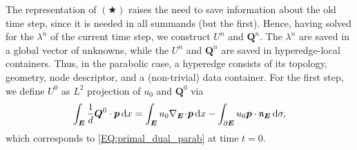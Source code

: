 \documentclass[a4paper, english, 12pt, reqno, draft]{amsart}
\theoremstyle{definition}
\theoremstyle{remark}
\numberwithin{equation}{section}
\newcommand{\Edge}{{\ensuremath{\boldsymbol E}}}
\newcommand{\Nabla}{\ensuremath{\nabla_\Edge}}
\newcommand{\Div}{\ensuremath{\Nabla\!\cdot\!}}
\newcommand{\Normal}{\ensuremath{\mathfrak n_\Edge}}
\renewcommand{\vec}[1]{\ensuremath{\boldsymbol{#1}}}
\newcommand{\dx}{\ensuremath{\, \textup d x}}
\newcommand{\ds}{\ensuremath{\, \textup d \sigma}}
\begin{document}
The representation of $(\bigstar)$ raises the need to save information about the old time step, since it is needed in all summands (but the first). Hence, having solved for the $\lambda^n$ of the current time step, we construct $U^n$ and $\vec Q^n$. The $\lambda^n$ are saved in a global vector of unknowns, while the $U^n$ and $\vec Q^n$ are saved in hyperedge-local containers. Thus, in the parabolic case, a hyperedge consists of its topology, geometry, node descriptor, and a (non-trivial) data container. For the first step, we define $U^0$ as $L^2$ projection of $u_0$ and $\vec Q^0$ via
%
\begin{equation}
 \int_\Edge \frac{1}{d} \vec Q^0 \cdot \vec p \dx = \int_\Edge u_0 \Div \vec p \dx - \int_{\partial \Edge} u_0 \vec p \cdot \Normal \ds,
\end{equation}
%
which corresponds to \eqref{EQ:primal_dual_parab} at time $t=0$.
\end{document}
